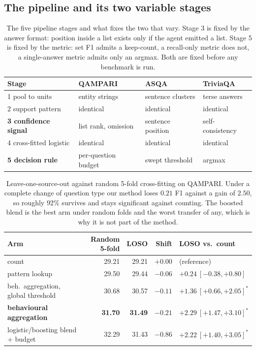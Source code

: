 \documentclass{article}
\begin{document}
\subsection{The pipeline and its two variable stages}
\label{app:pipeline}

\begin{table}[h]
  \caption{The five pipeline stages and what fixes the two that vary. Stage 3 is fixed by the answer format: position inside a list exists only if the agent emitted a list. Stage 5 is fixed by the metric: set F1 admits a keep-count, a recall-only metric does not, a single-answer metric admits only an argmax. Both are fixed before any benchmark is run.}
  \label{tab:slots}
  \centering
  \begin{tabular}{llll}
    \toprule
    Stage & QAMPARI & ASQA & TriviaQA \\
    \midrule
    1 pool to units       & entity strings   & sentence clusters  & terse answers      \\
    2 support pattern     & identical        & identical          & identical          \\
    \textbf{3 confidence signal} & list rank, omission & sentence position & self-consistency \\
    4 cross-fitted logistic & identical      & identical          & identical          \\
    \textbf{5 decision rule}     & per-question budget & swept threshold & argmax     \\
    \bottomrule
  \end{tabular}
\end{table}

\begin{table}
  \caption{Leave-one-source-out against random 5-fold cross-fitting on QAMPARI. Under a complete change of question type our method loses $0.21$ F1 against a gain of $2.50$, so roughly $92\%$ survives and stays significant against counting. The boosted blend is the best arm under random folds and the worst transfer of any, which is why it is not part of the method.}
  \label{tab:loso}
  \centering
  \begin{tabular}{lrrrl}
    \toprule
    Arm & Random 5-fold & LOSO & Shift & LOSO vs.\ count \\
    \midrule
    count                        & 29.21 & 29.21 & $+0.00$ & (reference) \\
    pattern lookup               & 29.50 & 29.44 & $-0.06$ & $+0.24\ [-0.38,+0.80]$ \\
    beh.\ aggregation, global threshold & 30.68 & 30.57 & $-0.11$ & $+1.36\ [+0.66,+2.05]^*$ \\
    \textbf{behavioural aggregation} & \textbf{31.70} & \textbf{31.49} & $\mathbf{-0.21}$ & $\mathbf{+2.29\ [+1.47,+3.10]^*}$ \\
    logistic/boosting blend + budget & 32.29 & 31.43 & $-0.86$ & $+2.22\ [+1.40,+3.05]^*$ \\
    \bottomrule
  \end{tabular}
\end{table}
\end{document}
